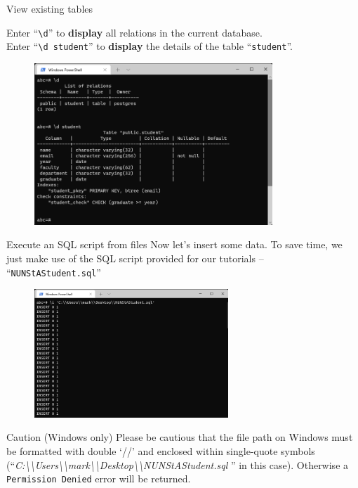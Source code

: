 \begin{frame}[fragile]{View existing tables}
	
	Enter ``\texttt{\textbackslash d}'' to \textbf{display} all relations in the current database.\\
	Enter ``\texttt{\textbackslash d student}'' to \textbf{display} the details of the table ``\texttt{student}''.
	\begin{figure}
		\includegraphics[width=0.8\textwidth]{t0-psql/images/6.png}
	\end{figure}
		
\end{frame}

\begin{frame}[fragile]{Execute an SQL script from files}
	Now let's insert some data. To save time, we just make use of the SQL script provided for our tutorials -- ``\texttt{NUNStAStudent.sql}''
	
	\begin{figure}
		\includegraphics[trim=0 5cm 0 0, clip, width=0.65\textwidth]{t0-psql/images/7.png}
	\end{figure}
	
	\begin{alertblock}{Caution (Windows only)}
		Please be cautious that the file path on Windows must be formatted with double `//' and enclosed within single-quote symbols (``\textit{C:\textbackslash\textbackslash Users\textbackslash\textbackslash mark\textbackslash\textbackslash Desktop\textbackslash\textbackslash NUNStAStudent.sql }'' in this case). Otherwise a \texttt{Permission Denied} error will be returned.
	\end{alertblock}
	
\end{frame}

